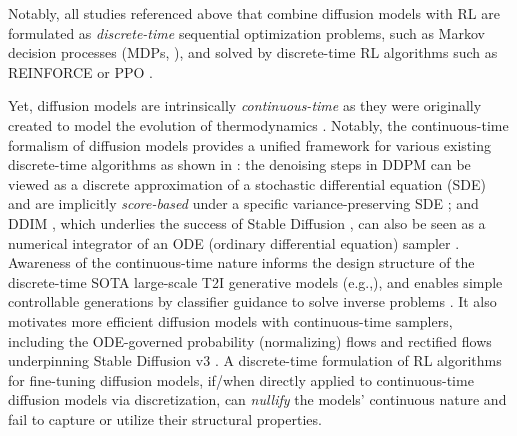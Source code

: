 \documentclass{article}
\theoremstyle{plain}
\theoremstyle{definition}
\theoremstyle{remark}
\begin{document}

Notably, all studies referenced above that combine diffusion models with RL are formulated as {\it discrete-time} sequential optimization problems, such as Markov decision processes (MDPs, \cite{puterman2014markov}), and solved by discrete-time RL algorithms such as REINFORCE \cite{sutton1999policy} or PPO \cite{schulman2017proximal}. 

Yet, diffusion models are intrinsically {\it continuous-time} as they were originally created to model the evolution of  thermodynamics \cite{sohl2015deep}.
Notably, the continuous-time formalism of diffusion models provides a unified framework for various existing discrete-time algorithms as shown in \cite{Song20SGMbySDE}: the denoising steps in DDPM \cite{Ho20DDPM} can be viewed as a discrete approximation of a stochastic differential equation (SDE) and are implicitly {\it score-based} under a specific variance-preserving SDE \cite{Song20SGMbySDE}; and DDIM \cite{DDIM}, which underlies the success of Stable Diffusion \cite{StableDiffusion}, can also be seen as a numerical integrator of an ODE (ordinary differential equation) sampler \cite{salimans2022progressive}. 
Awareness of the continuous-time nature informs the design structure of the discrete-time SOTA large-scale T2I generative models (e.g.,\cite{dhariwal2021diffusion,StableDiffusion,StableDiffusionv3}), and enables simple controllable generations by classifier guidance to solve inverse problems \cite{Song20SGMbySDE,song2021solving}. 
It also motivates more efficient diffusion models with continuous-time samplers, including the ODE-governed probability (normalizing) flows \cite{papamakarios2021normalizing,Song20SGMbySDE} and rectified flows \cite{RectifiedFlow,InstaFlow} underpinning Stable Diffusion v3 \cite{StableDiffusionv3}. A discrete-time formulation of RL algorithms for fine-tuning diffusion models, if/when directly applied to continuous-time diffusion models via discretization, can {\it nullify} the models' continuous nature and fail to capture or utilize their structural properties. 
\end{document}
